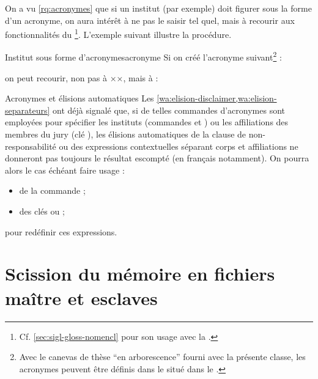 On a vu \vref{rq:acronymes} que si un institut (par exemple) doit figurer
sous la forme d'un acronyme, on aura intérêt à ne pas le saisir tel
quel, mais à recourir aux fonctionnalités du
\footnote{Cf. \vref{sec:sigl-gloss-nomencl} pour
  son usage avec la \yatcl.}. L'exemple suivant illustre la
procédure.
%
\begin{dbexample}{Institut sous forme d'acronymes}{acronyme}
  Si on créé l'acronyme suivant\footnote{Avec le canevas de thèse \enquote{en
      arborescence} fourni avec la présente classe, les acronymes peuvent être
    définis dans le \File{\acronymsfile} situé dans le
    \Directory{\auxiliarydirectory}.} :
\begin{preamblecode}
\end{preamblecode}
on peut recourir, non pas à ××, mais à :
\begin{preamblecode}
\end{preamblecode}
\end{dbexample}

\begin{dbremark}{Acronymes et élisions automatiques}{}
  Les \vref{wa:elision-disclaimer,wa:elision-separateurs} ont déjà signalé que,
  si de telles commandes d'acronymes sont employées pour spécifier les
  instituts (commandes  et ) ou les
  affiliations des membres du jury (clé ), les élisions
  automatiques de la clause de non-responsabilité ou des expressions
  contextuelles séparant corps et affiliations ne donneront pas toujours
  le résultat escompté (en français notamment). On pourra alors le cas échéant
  faire usage :
  \begin{itemize}
  \item de la commande  ;
  \item des clés  ou  ;
  \end{itemize}
  pour redéfinir ces expressions.
\end{dbremark}

\section{Scission du mémoire en fichiers maître et esclaves}
\label{sec:repart-du-memo}

